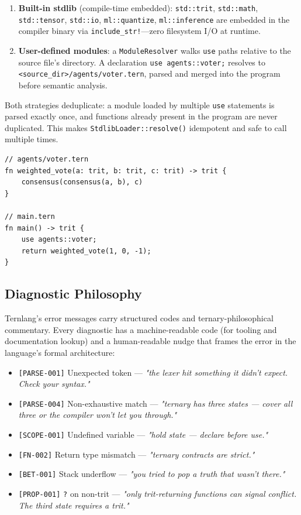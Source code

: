 \documentclass[11pt,a4paper]{article}
\begin{document}
\begin{enumerate}
  \item \textbf{Built-in stdlib} (compile-time embedded): \texttt{std::trit},
        \texttt{std::math}, \texttt{std::tensor}, \texttt{std::io},
        \texttt{ml::quantize}, \texttt{ml::inference} are embedded in the
        compiler binary via \texttt{include\_str!}—zero filesystem I/O at
        runtime.
  \item \textbf{User-defined modules}: a \texttt{ModuleResolver} walks
        \texttt{use} paths relative to the source file's directory. A
        declaration \texttt{use agents::voter;} resolves to
        \texttt{<source\_dir>/agents/voter.tern}, parsed and merged into
        the program before semantic analysis.
\end{enumerate}

Both strategies deduplicate: a module loaded by multiple \texttt{use}
statements is parsed exactly once, and functions already present in the
program are never duplicated. This makes \texttt{StdlibLoader::resolve()}
idempotent and safe to call multiple times.

\begin{lstlisting}[caption={Cross-file module import}]
// agents/voter.tern
fn weighted_vote(a: trit, b: trit, c: trit) -> trit {
    consensus(consensus(a, b), c)
}

// main.tern
fn main() -> trit {
    use agents::voter;
    return weighted_vote(1, 0, -1);
}
\end{lstlisting}

\subsection{Diagnostic Philosophy}
\label{subsec:diagnostics}

Ternlang's error messages carry structured codes and ternary-philosophical
commentary. Every diagnostic has a machine-readable code (for tooling and
documentation lookup) and a human-readable nudge that frames the error in
the language's formal architecture:

\begin{itemize}
  \item \texttt{[PARSE-001]} Unexpected token — \emph{"the lexer hit something
        it didn't expect. Check your syntax."}
  \item \texttt{[PARSE-004]} Non-exhaustive match — \emph{"ternary has three
        states — cover all three or the compiler won't let you through."}
  \item \texttt{[SCOPE-001]} Undefined variable — \emph{"hold state — declare
        before use."}
  \item \texttt{[FN-002]} Return type mismatch — \emph{"ternary contracts are
        strict."}
  \item \texttt{[BET-001]} Stack underflow — \emph{"you tried to pop a truth
        that wasn't there."}
  \item \texttt{[PROP-001]} \texttt{?} on non-trit — \emph{"only trit-returning
        functions can signal conflict. The third state requires a trit."}
\end{itemize}
\end{document}
